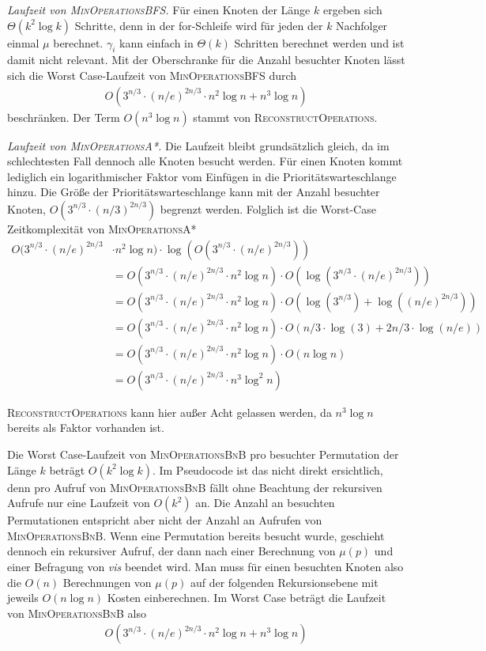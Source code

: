 \documentclass[a4paper, 10pt, ngerman]{article}
\begin{document}
\emph{{Laufzeit von \textsc{MinOperationsBFS}.}} Für einen Knoten der Länge $k$ ergeben sich $\Theta(k^2 \log k)$ Schritte, denn in der for-Schleife wird für jeden der $k$ Nachfolger einmal $\mu$ berechnet. $\gamma_i$ kann einfach in $\Theta(k)$ Schritten berechnet werden und ist damit nicht relevant. Mit der Oberschranke für die Anzahl besuchter Knoten lässt sich die Worst Case-Laufzeit von \textsc{MinOperationsBFS} durch
\begin{align*}
    O(3^{n/3} \cdot (n/e)^{2n/3} \cdot n^2 \log n + n^3 \log n)
\end{align*}
beschränken. Der Term $O(n^3 \log n)$ stammt von \textsc{ReconstructOperations}.

\emph{{Laufzeit von \textsc{MinOperationsA*}.}} Die Laufzeit bleibt grundsätzlich gleich, da im schlechtesten Fall dennoch alle Knoten besucht werden. Für einen Knoten kommt lediglich ein logarithmischer Faktor vom Einfügen in die Prioritätswarteschlange hinzu. Die Größe der Prioritätswarteschlange kann mit der Anzahl besuchter Knoten, $O(3^{n/3} \cdot (n/3)^{2n/3})$ begrenzt werden. Folglich ist die Worst-Case Zeitkomplexität von \textsc{MinOperationsA*} 
\begin{align*}
    O(3^{n/3} \cdot (n/e)^{2n/3} & \cdot n^2 \log n) \cdot \log (O(3^{n/3} \cdot (n/e)^{2n/3})) \\
     & = O(3^{n/3} \cdot (n/e)^{2n/3} \cdot n^2 \log n) \cdot 
     O(\log (3^{n/3} \cdot (n/e)^{2n/3})) \\
     & = O(3^{n/3} \cdot (n/e)^{2n/3} \cdot n^2 \log n) \cdot O(\log (3^{n/3}) + \log((n/e)^{2n/3})) \\
     & = O(3^{n/3} \cdot (n/e)^{2n/3} \cdot n^2 \log n) \cdot O(n/3 \cdot \log (3) + 2n/3 \cdot \log(n/e)) \\
     & = O(3^{n/3} \cdot (n/e)^{2n/3} \cdot n^2 \log n) \cdot O(n \log n) \\
     & = O(3^{n/3} \cdot (n/e)^{2n/3} \cdot n^3 \log^2 n)
\end{align*}

\textsc{ReconstructOperations} kann hier außer Acht gelassen werden, da $n^3 \log n$ bereits als Faktor vorhanden ist.

Die Worst Case-Laufzeit von \textsc{MinOperationsBnB} pro besuchter Permutation der Länge $k$ beträgt $O(k^2 \log k)$. Im Pseudocode ist das nicht direkt ersichtlich, denn pro Aufruf von \textsc{MinOperationsBnB} fällt ohne Beachtung der rekursiven Aufrufe nur eine Laufzeit von $O(k^2)$ an. Die Anzahl an besuchten Permutationen entspricht aber nicht der Anzahl an Aufrufen von \textsc{MinOperationsBnB}. Wenn eine Permutation bereits besucht wurde, geschieht dennoch ein rekursiver Aufruf, der dann nach einer Berechnung von $\mu(p)$ und einer Befragung von \emph{vis} beendet wird. Man muss für einen besuchten Knoten also die $O(n)$ Berechnungen von $\mu(p)$ auf der folgenden Rekursionsebene mit jeweils $O(n \log n)$ Kosten einberechnen. Im Worst Case beträgt die Laufzeit von \textsc{MinOperationsBnB} also
\begin{align*}
    O(3^{n/3} \cdot (n/e)^{2n/3} \cdot n^2 \log n + n^3 \log n)
\end{align*}
\end{document}
